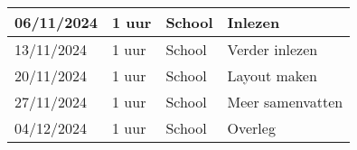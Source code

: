 \documentclass{article}
\begin{document}
\begin{longtable}{|p{}|p{}|p{}|p{}|}
    \hline
    06/11/2024     & 1 uur         & School          & Inlezen                                                                                                                                                                                                                                                                                                              \\
    \hline
    13/11/2024     & 1 uur         & School          & Verder inlezen                                                                                                                                                                                                                                                                                                       \\
    \hline
    20/11/2024     & 1 uur         & School          & Layout maken                                                                                                                                                                                                                                                                                                         \\
    \hline
    27/11/2024     & 1 uur         & School          & Meer samenvatten                                                                                                                                                                                                                                                                                                     \\
    \hline
    04/12/2024     & 1 uur         & School          & Overleg                                                                                                                                                                                                                                                                                                              \\
    \hline
\end{longtable}
\end{document}

